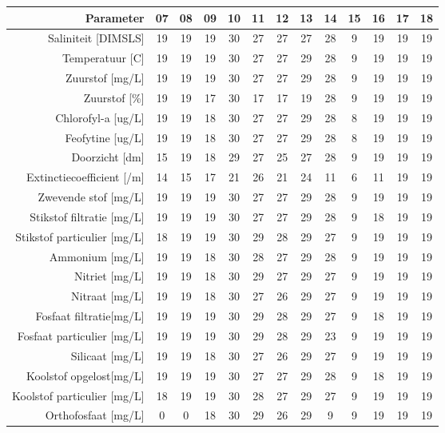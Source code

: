 \begin{tabular}{ r |c | c | c | c | c |c | c | c | c | c | c | c } 
\rowcolor[HTML]{EFEFEF}  
 Parameter & 07 & 08 & 09 & 10 & 11 & 12 & 13 & 14 & 15 & 16 & 17 & 18 \\    \hline     
Saliniteit [DIMSLS] &19 & 19 & 19 & 30 & 27 & 27 & 27 & 28 & 9 & 19 & 19 & 19 \\
Temperatuur [C] &19 & 19 & 19 & 30 & 27 & 27 & 29 & 28 & 9 & 19 & 19 & 19 \\
Zuurstof [mg/L] &19 & 19 & 19 & 30 & 27 & 27 & 29 & 28 & 9 & 19 & 19 & 19 \\
Zuurstof [\%] &19 & 19 & 17 & 30 & 17 & 17 & 19 & 28 & 9 & 19 & 19 & 19 \\
Chlorofyl-a [ug/L] &19 & 19 & 18 & 30 & 27 & 27 & 29 & 28 & 8 & 19 & 19 & 19 \\
Feofytine [ug/L] &19 & 19 & 18 & 30 & 27 & 27 & 29 & 28 & 8 & 19 & 19 & 19 \\
Doorzicht [dm] &15 & 19 & 18 & 29 & 27 & 25 & 27 & 28 & 9 & 19 & 19 & 19 \\
Extinctiecoefficient [/m] &14 & 15 & 17 & 21 & 26 & 21 & 24 & 11 & 6 & 11 & 19 & 19 \\
Zwevende stof [mg/L] &19 & 19 & 19 & 30 & 27 & 27 & 29 & 28 & 9 & 19 & 19 & 19 \\
Stikstof filtratie [mg/L] &19 & 19 & 19 & 30 & 27 & 27 & 29 & 28 & 9 & 18 & 19 & 19 \\
Stikstof particulier [mg/L] &18 & 19 & 19 & 30 & 29 & 28 & 29 & 27 & 9 & 19 & 19 & 19 \\
Ammonium [mg/L] &19 & 19 & 18 & 30 & 28 & 27 & 29 & 28 & 9 & 19 & 19 & 19 \\
Nitriet [mg/L] &19 & 19 & 18 & 30 & 29 & 27 & 29 & 27 & 9 & 19 & 19 & 19 \\
Nitraat [mg/L] &19 & 19 & 18 & 30 & 27 & 26 & 29 & 27 & 9 & 19 & 19 & 19 \\
Fosfaat filtratie[mg/L] &19 & 19 & 19 & 30 & 29 & 28 & 29 & 27 & 9 & 18 & 19 & 19 \\
Fosfaat particulier [mg/L] &19 & 19 & 19 & 30 & 29 & 28 & 29 & 23 & 9 & 19 & 19 & 19 \\
Silicaat [mg/L] &19 & 19 & 18 & 30 & 27 & 26 & 29 & 27 & 9 & 19 & 19 & 19 \\
Koolstof opgelost[mg/L] &19 & 19 & 19 & 30 & 27 & 27 & 29 & 28 & 9 & 18 & 19 & 19 \\
Koolstof particulier [mg/L] &18 & 19 & 19 & 30 & 28 & 27 & 29 & 27 & 9 & 19 & 19 & 19 \\
Orthofosfaat [mg/L] &0 & 0 & 18 & 30 & 29 & 26 & 29 & 9 & 9 & 19 & 19 & 19 \\

\end{tabular}
